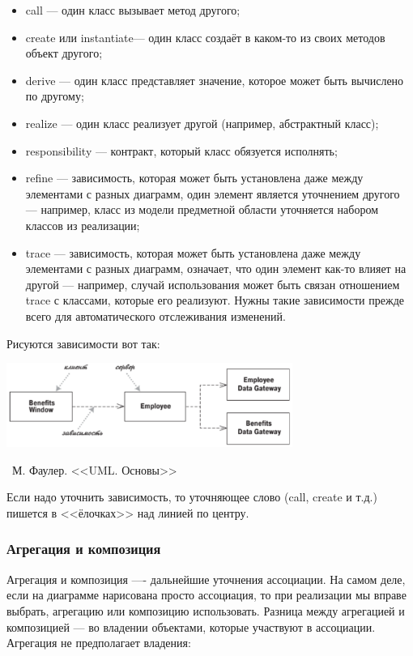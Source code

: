 \documentclass[a5paper]{article}
\newcommand{\attribution}[1] {
    \vspace{-5mm}\begin{flushright}\begin{scriptsize}%
    {\textcopyright\, #1}\end{scriptsize}\end{flushright}
}
\begin{document}
\begin{itemize}
    \item call --- один класс вызывает метод другого;
    \item create или instantiate--- один класс создаёт в каком-то из своих методов объект другого;
    \item derive --- один класс представляет значение, которое может быть вычислено по другому;
    \item realize --- один класс реализует другой (например, абстрактный класс);
    \item responsibility --- контракт, который класс обязуется исполнять;
    \item refine --- зависимость, которая может быть установлена даже между элементами с разных диаграмм, один элемент является уточнением другого --- например, класс из модели предметной области уточняется набором классов из реализации;
    \item trace --- зависимость, которая может быть установлена даже между элементами с разных диаграмм, означает, что один элемент как-то влияет на другой --- например, случай использования может быть связан отношением trace с классами, которые его реализуют. Нужны такие зависимости прежде всего для автоматического отслеживания изменений.
\end{itemize}

Рисуются зависимости вот так:

\begin{center}
    \includegraphics[width=0.7\textwidth]{dependencies.png}
    \attribution{М. Фаулер. <<UML. Основы>>}
\end{center}

Если надо уточнить зависимость, то уточняющее слово (call, create и т.д.) пишется в <<ёлочках>> над линией по центру.

\subsubsection{Агрегация и композиция}

Агрегация и композиция ---- дальнейшие уточнения ассоциации. На самом деле, если на диаграмме нарисована просто ассоциация, то при реализации мы вправе выбрать, агрегацию или композицию использовать. Разница между агрегацией и композицией --- во владении объектами, которые участвуют в ассоциации. Агрегация не предполагает владения:
\end{document}
